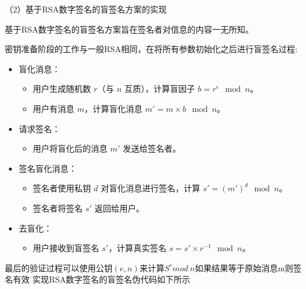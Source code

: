 \documentclass[a4paper,11pt,UTF8]{ctexart}
\begin{document}
            （2）基于RSA数字签名的盲签名方案的实现\par
                基于RSA数字签名的盲签名方案旨在签名者对信息的内容一无所知。\par
                密钥准备阶段的工作与一般RSA相同，在将所有参数初始化之后进行盲签名过程:\par
                \begin{itemize}
                    \item 盲化消息：
                      \begin{itemize}
                        \item 用户生成随机数 \(r\)（与 \(n\) 互质），计算盲因子 \(b = r^e \mod n\)。
                        \item 用户有消息 \(m\)，计算盲化消息 \(m' = m \times b \mod n\)。
                      \end{itemize}
                    \item 请求签名：
                      \begin{itemize}
                        \item 用户将盲化后的消息 \(m'\) 发送给签名者。
                      \end{itemize}
                    \item 签名盲化消息：
                      \begin{itemize}
                        \item 签名者使用私钥 \(d\) 对盲化消息进行签名，计算 \(s' = (m')^d \mod n\)。
                        \item 签名者将签名 \(s'\) 返回给用户。
                      \end{itemize}
                    \item 去盲化：
                      \begin{itemize}
                        \item 用户接收到盲签名 \(s'\)，计算真实签名 \(s = s' \times r^{-1} \mod n\)。
                      \end{itemize}
                \end{itemize}
                最后的验证过程可以使用公钥$(e,n)$来计算$S^{e}mod\ n$如果结果等于原始消息m则签名有效
                实现RSA数字签名的盲签名伪代码如下所示
\end{document}
